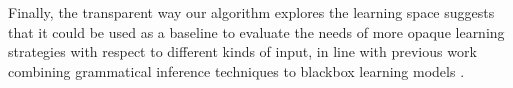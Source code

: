 \documentclass[11pt,a4paper]{article}
\begin{document}
Finally, the transparent way our algorithm explores the learning space suggests that it could be used as a baseline to evaluate the needs of more opaque learning strategies with respect to different kinds of input, in line with previous work combining  grammatical inference techniques to blackbox learning models \citep[a.o.]{avcu2017subregular,mahalunkar2018using}.
 


\end{document}

